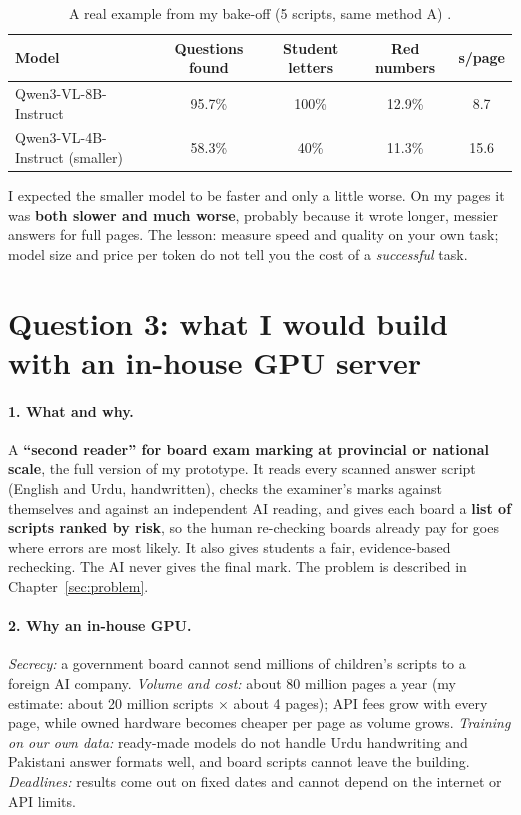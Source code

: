 \begin{table}[H]
\centering
\caption[A real example from my bake-off (5 scripts, same method A).]{A real example from my bake-off (5 scripts, same method A) .}
\label{tab:q2example}
\begin{tabular}{@{}lcccc@{}}
\toprule
\textbf{Model} & \textbf{Questions found} & \textbf{Student letters} & \textbf{Red numbers} & \textbf{s/page} \\
\midrule
Qwen3-VL-8B-Instruct & 95.7\% & 100\% & 12.9\% & 8.7 \\
Qwen3-VL-4B-Instruct (smaller) & 58.3\% & 40\% & 11.3\% & 15.6 \\
\bottomrule
\end{tabular}
\end{table}
I expected the smaller model to be faster and only a little worse. On my pages it was \textbf{both slower and much worse},
probably because it wrote longer, messier answers for full pages. The lesson: measure speed and quality on your own task;
model size and price per token do not tell you the cost of a \emph{successful} task.

\section{Question 3: what I would build with an in-house GPU server}

\paragraph{1. What and why.} A \textbf{``second reader'' for board exam marking at provincial or national scale}, the full
version of my prototype. It reads every scanned answer script (English and Urdu, handwritten), checks the examiner's marks
against themselves and against an independent AI reading, and gives each board a \textbf{list of scripts ranked by risk},
so the human re-checking boards already pay for goes where errors are most likely. It also gives students a fair,
evidence-based rechecking. The AI never gives the final mark. The problem is described in Chapter~\ref{sec:problem}.

\paragraph{2. Why an in-house GPU.} \emph{Secrecy:} a government board cannot send millions of children's scripts to a
foreign AI company. \emph{Volume and cost:} about 80 million pages a year (my estimate: about 20 million scripts $\times$
about 4 pages); API fees grow with every page, while owned hardware becomes cheaper per page as volume grows.
\emph{Training on our own data:} ready-made models do not handle Urdu handwriting and Pakistani answer formats well, and
board scripts cannot leave the building. \emph{Deadlines:} results come out on fixed dates and cannot depend on the
internet or API limits.

